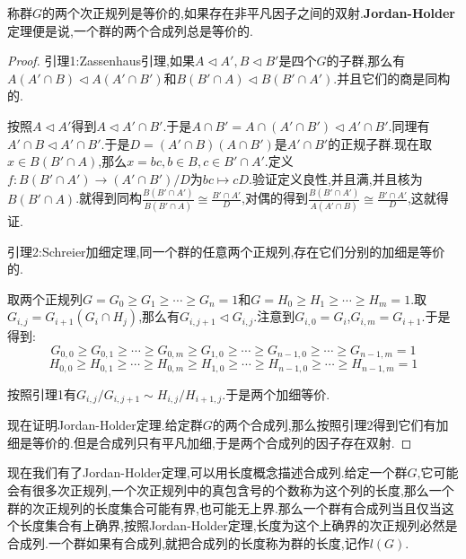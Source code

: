 称群$G$的两个次正规列是等价的,如果存在非平凡因子之间的双射.\textbf{Jordan-Holder}定理便是说,一个群的两个合成列总是等价的.
\begin{proof}
	
	引理1:Zassenhaus引理,如果$A\triangleleft A',B\triangleleft B'$是四个$G$的子群,那么有$A(A'\cap B)\triangleleft A(A'\cap B')$和$B(B'\cap A)\triangleleft B(B'\cap A')$.并且它们的商是同构的.
	
	按照$A\triangleleft A'$得到$A\triangleleft A'\cap B'$.于是$A\cap B'=A\cap(A'\cap B')\triangleleft A'\cap B'$.同理有$A'\cap B\triangleleft A'\cap B'$.于是$D=(A'\cap B)(A\cap B')$是$A'\cap B'$的正规子群.现在取$x\in B(B'\cap A)$,那么$x=bc,b\in B,c\in B'\cap A'$.定义$f:B(B'\cap A')\to(A'\cap B')/D$为$bc\mapsto cD$.验证定义良性,并且满,并且核为$B(B'\cap A)$.就得到同构$\frac{B(B'\cap A')}{B(B'\cap A)}\cong\frac{B'\cap A'}{D}$,对偶的得到$\frac{B(B'\cap A')}{A(A'\cap B)}\cong\frac{B'\cap A'}{D}$,这就得证.
	
	引理2:Schreier加细定理,同一个群的任意两个正规列,存在它们分别的加细是等价的.
	
	取两个正规列$G=G_0\ge G_1\ge\cdots\ge G_n=1$和$G=H_0\ge H_1\ge\cdots\ge H_m=1$.取$G_{i,j}=G_{i+1}(G_i\cap H_j)$,那么有$G_ {i,j+1}\triangleleft G_{i,j}$.注意到$G_ {i,0}=G_i$,$G_{i,m}=G_{i+1}$.于是得到:
	$$G_{0,0}\ge G_{0,1}\ge\cdots\ge G_{0,m}\ge G_{1,0}\ge\cdots\ge G_{n-1,0}\ge\cdots\ge G_{n-1,m}=1$$
	$$H_{0,0}\ge H_{0,1}\ge\cdots\ge H_{0,m}\ge H_{1,0}\ge\cdots\ge H_{n-1,0}\ge\cdots\ge H_{n-1,m}=1$$
	
	按照引理1有$G_{i,j}/G_{i,j+1}\sim H_{i,j}/H_{i+1,j}$.于是两个加细等价.
	
	现在证明Jordan-Holder定理.给定群$G$的两个合成列,那么按照引理2得到它们有加细是等价的.但是合成列只有平凡加细,于是两个合成列的因子存在双射.
	
\end{proof}

现在我们有了Jordan-Holder定理,可以用长度概念描述合成列.给定一个群$G$,它可能会有很多次正规列,一个次正规列中的真包含号的个数称为这个列的长度,那么一个群的次正规列的长度集合可能有界,也可能无上界.那么一个群有合成列当且仅当这个长度集合有上确界,按照Jordan-Holder定理,长度为这个上确界的次正规列必然是合成列.一个群如果有合成列,就把合成列的长度称为群的长度,记作$l(G)$.

